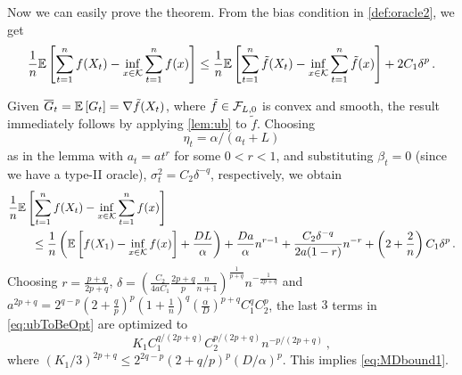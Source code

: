 Now we can easily prove the theorem.
From the bias condition in \cref{def:oracle2}, we get
\begin{align*}
 \frac{1}{n} \mathbb{E}\left[ \sum_{t=1}^n f(X_t) - \inf_{x \in \mathcal{K}}\sum_{t=1}^n f(x) \right]
 \le \frac{1}{n}\mathbb{E}\left[ \sum_{t=1}^n \tilde{f}(X_t) - \inf_{x \in \mathcal{K}}\sum_{t=1}^n \tilde{f}(x) \right] +2C_1 \delta^p
 \,.
\end{align*}

Given $\overline{G}_t=\mathbb{E}\left[G_t\right] = \nabla \tilde{f}(X_t)$, where $\tilde{f}\in \mathcal{F}_{L,0}$ is convex and smooth,
the result immediately follows by applying \cref{lem:ub} to $\tilde{f}$. Choosing $$\eta_t = \alpha/(a_t+L)$$ as in the lemma with 
$a_t=a t^r$ for some $0<r<1$, and
substituting
 $\beta_t = 0$ (since we have a type-II oracle), $\sigma^2_t = C_2 \delta^{-q}$, respectively, we obtain
 \begin{align}
\MoveEqLeft
\frac{1}{n} \EE{ \sum_{t=1}^n f( X_t) - \inf_{x \in \cK} \sum_{t=1}^n f(x)} \nonumber \\
&\le \frac{1}{n}\left(\EE{f(X_1)-\inf_{x \in \cK}f(x)}+\frac{DL}{\alpha}  \right) %
+\frac{Da}{\alpha} n^{r-1}+\dfrac{C_2 \delta^{-q}}{2a(1-r)}n^{-r}+ \left(2+\dfrac{2}{n}\right)C_1\delta^p \,.
\label{eq:ubToBeOpt}
 \end{align}
 Choosing $r = \frac{p+q}{2p+q}$,  
 $\delta = \left( \tfrac{C_2}{4aC_1}\tfrac{2p+q}{p}\tfrac{n}{n+1}\right)^{\frac{1}{p+q}}n^{-\frac{1}{2p+q}}$  and
 $a^{2p+q} =2^{q-p}\left( 2+\tfrac{q}{p} \right)^p\left(1+ \tfrac{1}{n} \right)^q \left( \tfrac{\alpha}{D} \right)^{p+q}C_1^q C_2^p $,
the last $3$ terms in \eqref{eq:ubToBeOpt} are optimized to
 \[
 K_1 C_1^{q/(2p+q)} C_2^{p/(2p+q)} n ^{-p/(2p+q)} \,,
 \]
 where
 $(K_1/3)^{2p+q} \le 2^{2q-p}\left(2+q/p \right)^p \left(D/\alpha\right)^{p}$. This implies \eqref{eq:MDbound1}.
 
